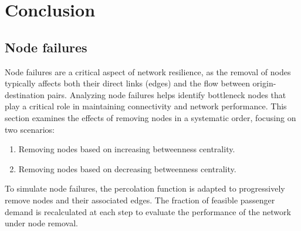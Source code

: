 \documentclass[
  letterpaper,
  DIV=11,
  numbers=noendperiod]{scrartcl}
\providecommand{\tightlist}{%
  \setlength{\itemsep}{0pt}\setlength{\parskip}{0pt}}\usepackage{longtable,booktabs,array}
\begin{document}
\section{Conclusion}\label{conclusion}

\subsection{Node failures}\label{node-failures}

Node failures are a critical aspect of network resilience, as the
removal of nodes typically affects both their direct links (edges) and
the flow between origin-destination pairs. Analyzing node failures helps
identify bottleneck nodes that play a critical role in maintaining
connectivity and network performance. This section examines the effects
of removing nodes in a systematic order, focusing on two scenarios:

\begin{enumerate}
\def\labelenumi{\arabic{enumi}.}
\tightlist
\item
  Removing nodes based on increasing betweenness centrality.
\item
  Removing nodes based on decreasing betweenness centrality.
\end{enumerate}

To simulate node failures, the percolation function is adapted to
progressively remove nodes and their associated edges. The fraction of
feasible passenger demand is recalculated at each step to evaluate the
performance of the network under node removal.
\end{document}

